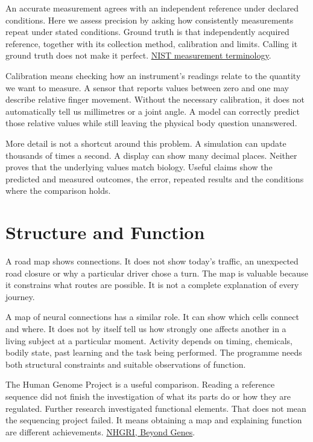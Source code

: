 An accurate measurement agrees with an independent reference under declared conditions. Here we assess precision by asking how consistently measurements repeat under stated conditions. Ground truth is that independently acquired reference, together with its collection method, calibration and limits. Calling it ground truth does not make it perfect. \href{https://www.nist.gov/pml/nist-technical-note-1297/nist-tn-1297-appendix-d1-terminology}{NIST measurement terminology}.\par

Calibration means checking how an instrument's readings relate to the quantity we want to measure. A sensor that reports values between zero and one may describe relative finger movement. Without the necessary calibration, it does not automatically tell us millimetres or a joint angle. A model can correctly predict those relative values while still leaving the physical body question unanswered.\par

More detail is not a shortcut around this problem. A simulation can update thousands of times a second. A display can show many decimal places. Neither proves that the underlying values match biology. Useful claims show the predicted and measured outcomes, the error, repeated results and the conditions where the comparison holds.\par

\section{Structure and Function}

A road map shows connections. It does not show today's traffic, an unexpected road closure or why a particular driver chose a turn. The map is valuable because it constrains what routes are possible. It is not a complete explanation of every journey.\par

A map of neural connections has a similar role. It can show which cells connect and where. It does not by itself tell us how strongly one affects another in a living subject at a particular moment. Activity depends on timing, chemicals, bodily state, past learning and the task being performed. The programme needs both structural constraints and suitable observations of function.\par

The Human Genome Project is a useful comparison. Reading a reference sequence did not finish the investigation of what its parts do or how they are regulated. Further research investigated functional elements. That does not mean the sequencing project failed. It means obtaining a map and explaining function are different achievements. \href{https://www.genome.gov/11009066/2003-release-scientists-venture-deeper-into-the-human-genome}{NHGRI, Beyond Genes}.\par

